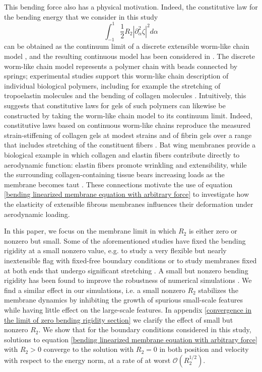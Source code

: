\documentclass{article}[12pt]
\theoremstyle{Theorem}
\begin{document}
This bending force also has a physical motivation. Indeed, the constitutive law for the bending energy that we consider in this study $$\int_{-1}^1\frac{1}{2}R_2|\partial_\alpha^2\zeta|^2d\alpha$$ can be obtained as the continuum limit of a discrete extensible worm-like chain model \cite{PhysRevE.92.032603,barkema2012model,barkema2017efficient}, and the resulting continuous model has been considered in \cite{obermayer2009tension}. The discrete worm-like chain model represents a polymer chain with beads connected by springs; experimental studies support this worm-like chain description of individual biological polymers, including for example the stretching of tropoelastin molecules \cite{baldock2011shape} and the bending of collagen molecules \cite{rezaei2018environmentally}. Intuitively, this suggests that constitutive laws for gels of such polymers can likewise be constructed by taking the worm-like chain model to its continuum limit. Indeed, constitutive laws based on continuous worm-like chains reproduce the measured strain-stiffening of collagen gels at modest strains \cite{storm2005nonlinear} and of fibrin gels over a range that includes stretching of the constituent fibers \cite{piechocka2016multi}. Bat wing membranes provide a biological example in which collagen and elastin fibers contribute directly to aerodynamic function: elastin fibers promote wrinkling and extensibility, while the surrounding collagen-containing tissue bears increasing loads as the membrane becomes taut \cite{cheney2015wrinkle}. These connections motivate the use of equation \eqref{bending linearized membrane equation with arbitrary force} to investigate how the elasticity of extensible fibrous membranes influences their deformation under aerodynamic loading.
\newline

In this paper, we focus on the membrane limit in which $R_2$ is either zero or nonzero but small. Some of the aforementioned studies have fixed the bending rigidity at a small nonzero value, e.g. to study a very flexible but nearly inextensible flag with fixed-free boundary conditions \cite{connell2007flapping} or to study membranes fixed at both ends that undergo significant stretching \cite{sun2022dynamics, zhang2026flapping}. A small but nonzero bending rigidity has been found to improve the robustness of numerical simulations \cite{connell2007flapping,zhang2026flapping}. We find a similar effect in our simulations, i.e. a small nonzero $R_2$ stabilizes the membrane dynamics by inhibiting the growth of spurious small-scale features while having little effect on the large-scale features. In appendix \ref{convergence in the limit of zero bending rigidity section} we clarify the effect of small but nonzero $R_2$. We show that for the boundary conditions considered in this study, solutions to equation \eqref{bending linearized membrane equation with arbitrary force} with $R_2 >0$ converge to the solution with $R_2 = 0$ in both position and velocity with respect to the energy norm, at a rate of at worst $\mathcal{O}(R_2^{1/2})$.
\newline
\end{document}
